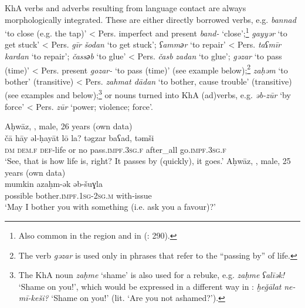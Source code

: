 \documentclass[output=paper,nonflat]{langsci/langscibook}
\begin{document}
KhA verbs and adverbs resulting from language contact are always morphologically integrated. These are either directly borrowed  verbs, e.g. \textit{bannad} ‘to close (e.g. the tap)’ < Pers. imperfect and present  \textit{band-} ‘close’;\footnote{Also common in the  region and in  (\citealt{BehnstedtWoidich2014}: 290).} \textit{gayyər} ‘to get stuck’ <  Pers. \textit{gīr} \textit{šodan} ‘to get stuck’; \textit{ʕamm{әr}} ‘to repair’ < Pers. \textit{taʕmīr} \textit{kardan} ‘to repair’; \textit{čass{әb}} ‘to glue’ < Pers. \textit{časb} \textit{zadan} ‘to glue’; \textit{gəzar} ‘to pass (time)’ < Pers. present  \textit{gozar-} ‘to pass (time)’ (see example  below);\footnote{The verb \textit{gəzar} is used only in phrases that refer to the “passing by” of life.} \textit{zaḥəm} ‘to bother’ (transitive) < Pers. \textit{zahmat dādan} ‘to bother, cause trouble’ (transitive) (see examples  and  below);\footnote{The KhA noun \textit{zaḥme} `shame' is also used for a rebuke, e.g. \textit{zaḥme} \textit{ʕalīək!} ‘Shame on you!’, which would be expressed in a different way in : \textit{ḫeǧālat} \textit{ne-mī-keši?} ‘Shame on you!' (lit. ‘Are you not ashamed?’).} or  nouns turned into KhA (ad)verbs, e.g. \textit{əb-zūr} ‘by force’ < Pers. \textit{zūr} ‘power; violence; force’.

\ea
{Aḥwāz, , male, 26 years (own data)}\\ \label{ca}
\gll čā hāy əl-ḥayāt lō la? təgzar baʕad, təmši\\
     \textsc{dm} \textsc{dem}.\textsc{f} \textsc{def}{}-life or no pass.\textsc{impf}.\textsc{3sg.f} after\_all go.\textsc{impf.3sg.f}\\
\glt ‘See, that is how life is, right? It passes by (quickly), it goes.’
\z
{}
\ea \label{mumkin}
{Aḥwāz, , male, 25 years (own data)}\\
\gll mumkin azaḥm-ək əb-šuɣla\\
     possible bother.\textsc{impf}.\textsc{1sg}{}-\textsc{2sg.m} with-issue\\
\glt ‘May I bother you with something (i.e. ask you a favour)?’
\z
\end{document}
